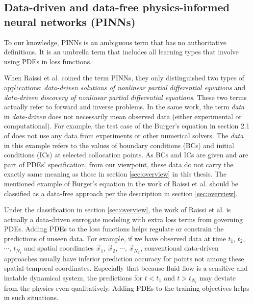 \subsection*{Data-driven and data-free physics-informed neural networks (PINNs)}

To our knowledge, PINNs is an ambiguous term that has no authoritative definitions.
It is an umbrella term that includes all learning types that involve using PDEs in loss functions.

When Raissi et al. \cite{raissi_physics-informed_2017,raissi_physics_2017,raissi_physics-informed_2019} coined the term PINNs, they only distinguished two types of applications: {\it data-driven solutions of nonlinear partial differential equations} and {\it data-driven discovery of nonlinear partial differential equations}.
These two terms actually refer to forward and inverse problems.
In the same work, the term {\it data} in {\it data-driven} does not necessarily mean observed data (either experimental or computational).
For example, the test case of the Burger's equation in section 2.1 of \cite{raissi_physics-informed_2017} does not use any data from experiments or other numerical solvers.
The {\it data} in this example refers to the values of boundary conditions (BCs) and initial conditions (ICs) at selected collocation points.
As BCs and ICs are given and are part of PDEs' specification, from our viewpoint, these data do not carry the exactly same meaning as those in section \ref{sec:overview} in this thesis.
The mentioned example of Burger's equation in the work of Raissi et al. should be classified as a data-free approach per the description in section \ref{sec:overview}.

Under the classification in section \ref{sec:overview}, the work of Raissi et al. is actually a data-driven surrogate modeling with extra loss terms from governing PDEs.
Adding PDEs to the loss functions helps regulate or constrain the predictions of unseen data.
For example, if we have observed data at time $t_1$, $t_2$, $\cdots$, $t_{N_t}$ and spatial coordinates $\vec{x}_1$, $\vec{x}_2$, $\cdots$, $\vec{x}_{N_x}$, conventional data-driven approaches usually have inferior prediction accuracy for points not among these spatial-temporal coordinates.
Especially that because fluid flow is a sensitive and instable dynamical system, the predictions for $t < t_1$ and $t > t_{N_t}$ may deviate from the physics even qualitatively.
Adding PDEs to the training objectives helps in such situations.

